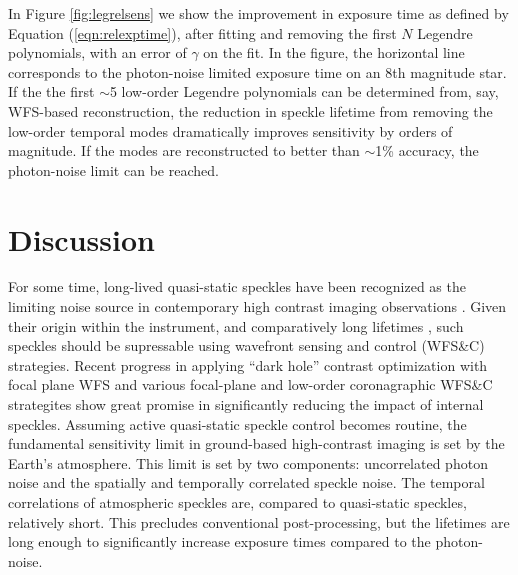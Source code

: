 \documentclass[10pt,preprint]{aastex631}
\begin{document}
In Figure \ref{fig:legrelsens} we show the improvement in exposure time as defined by Equation (\ref{eqn:relexptime}), after fitting and removing the first $N$ Legendre polynomials, with an error of $\gamma$ on the fit.  In the figure, the horizontal line corresponds to the photon-noise limited exposure time on an 8th magnitude star.  If the the first $\sim$5 low-order Legendre polynomials can be determined from, say, WFS-based reconstruction, the reduction in speckle lifetime from removing the low-order temporal modes dramatically improves sensitivity by orders of magnitude.  If the modes are reconstructed to better than $\sim$1\% accuracy, the photon-noise limit can be reached.

\section{Discussion}
For some time, long-lived quasi-static speckles have been recognized as the limiting noise source in contemporary high contrast imaging observations \citep[e.g.][]{2007ApJ...654..633H}.  Given their origin within the instrument, and comparatively long lifetimes \citep{2012A&A...541A.136M}, such speckles should be supressable using wavefront sensing and control (WFS\&C) strategies.  Recent progress in applying ``dark hole'' contrast optimization with focal plane WFS \citep{2020A&A...638A.117P} and various focal-plane \citep{2010A&A...509A..31G} and low-order coronagraphic WFS\&C strategites \citep[e.g.][]{2017PASP..129i5002S} show great promise in significantly reducing the impact of internal speckles.  Assuming active quasi-static speckle control becomes routine, the fundamental sensitivity limit in ground-based high-contrast imaging is set by the Earth's atmosphere.  This limit is set by two components: uncorrelated photon noise and the spatially and temporally correlated speckle noise.  The temporal correlations of atmospheric speckles are, compared to quasi-static speckles, relatively short. This precludes conventional post-processing, but the lifetimes are long enough to significantly increase exposure times compared to the photon-noise.
\end{document}
